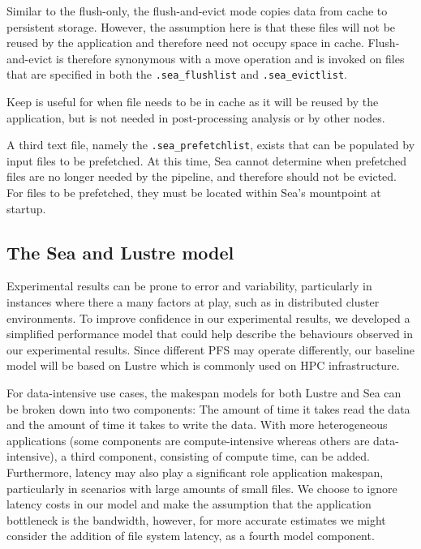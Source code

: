 \documentclass[10pt,journal,compsoc]{IEEEtran}
\begin{document}
Similar to the flush-only, the flush-and-evict mode copies data from cache to
persistent storage. However, the assumption here is that these files will not be
reused by the application and therefore need not occupy space in cache.
Flush-and-evict is therefore synonymous with a move operation and is invoked on
files that are specified in both the \texttt{.sea\_flushlist} and
\texttt{.sea\_evictlist}.


Keep is useful for when file needs to be in cache as it will be reused by the
application, but is not needed in post-processing analysis or by other nodes.

A third text file, namely the \texttt{.sea\_prefetchlist}, exists that can be populated by input
files to be prefetched. At this time, Sea cannot determine when prefetched files are no longer needed by the pipeline, and
therefore should not be evicted. For files to be prefetched, they must be located within Sea's mountpoint at startup.


\subsection{The Sea and Lustre model}\label{ss:sea-comp:model}

      Experimental results can be prone to error and variability, particularly
      in instances where there a many factors at play, such as in distributed cluster
      environments. To improve confidence in our experimental results, we developed a
      simplified performance model that could help describe the behaviours observed in our experimental
      results. Since different PFS may
      operate differently, our baseline model will be based on Lustre which is
      commonly used on HPC infrastructure.

      For data-intensive use cases, the makespan models for both Lustre and Sea
      can be broken down into two components: The amount of time it takes read
      the data and the amount of time it takes to write the data. With more
      heterogeneous applications (some components are compute-intensive whereas
      others are data-intensive), a third component, consisting of compute time,
      can be added. Furthermore, latency may also play a significant role
      application makespan, particularly in scenarios with large amounts of
      small files. We choose to ignore latency costs in our model and make the
      assumption that the application bottleneck is the bandwidth, however, for
      more accurate estimates we might consider the addition of file system
      latency, as a fourth model component.
\end{document}

